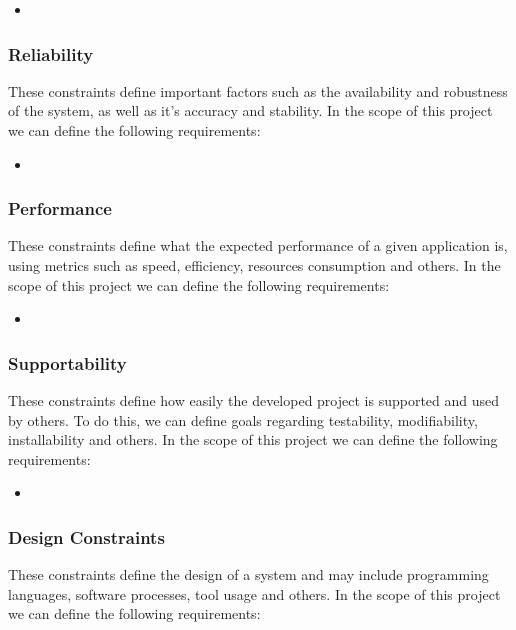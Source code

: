 \begin{itemize}
	\item 
\end{itemize}

\subsubsection{Reliability}

These constraints define important factors such as the availability and robustness of the system, as well as it's accuracy and stability. In the scope of this project we can define the following requirements:

\begin{itemize}
	\item 
\end{itemize}

\subsubsection{Performance}

These constraints define what the expected performance of a given application is, using metrics such as speed, efficiency, resources consumption and others. In the scope of this project we can define the following requirements:

\begin{itemize}
	\item 
\end{itemize}

\subsubsection{Supportability}

These constraints define how easily the developed project is supported and used by others. To do this, we can define goals regarding testability, modifiability, installability and others. In the scope of this project we can define the following requirements:

\begin{itemize}
	\item 
\end{itemize}

\subsubsection{Design Constraints}

These constraints define the design of a system and may include programming languages, software processes, tool usage and others. In the scope of this project we can define the following requirements:

